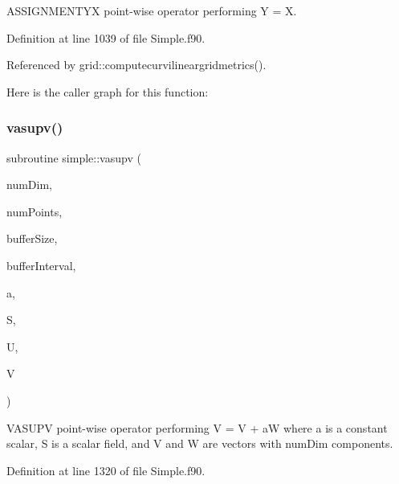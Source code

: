 A\+S\+S\+I\+G\+N\+M\+E\+N\+T\+YX point-\/wise operator performing Y = X. 



Definition at line 1039 of file Simple.\+f90.



Referenced by grid\+::computecurvilineargridmetrics().

Here is the caller graph for this function\+:
\hypertarget{namespacesimple_ac3b0bcd4d9660231edd99b833499f6c0}{}\label{namespacesimple_ac3b0bcd4d9660231edd99b833499f6c0} 
\subsubsection{\texorpdfstring{vasupv()}{vasupv()}}
{\footnotesize\ttfamily subroutine simple\+::vasupv (\begin{DoxyParamCaption}\item[{integer(kind=4), intent(in)}]{num\+Dim,  }\item[{integer(kind=8), intent(in)}]{num\+Points,  }\item[{integer(kind=8), dimension(numdim), intent(in)}]{buffer\+Size,  }\item[{integer(kind=8), dimension(2$\ast$numdim), intent(in)}]{buffer\+Interval,  }\item[{real(kind=8), intent(in)}]{a,  }\item[{real(kind=8), dimension(numpoints), intent(in)}]{S,  }\item[{real(kind=8), dimension(numdim$\ast$numpoints), intent(in)}]{U,  }\item[{real(kind=8), dimension(numdim$\ast$numpoints), intent(inout)}]{V }\end{DoxyParamCaption})}



V\+A\+S\+U\+PV point-\/wise operator performing V = V + aW where a is a constant scalar, S is a scalar field, and V and W are vectors with num\+Dim components. 



Definition at line 1320 of file Simple.\+f90.

\hypertarget{namespacesimple_ae38e091c7b77f88fbac6a96c4cd798e1}{}\label{namespacesimple_ae38e091c7b77f88fbac6a96c4cd798e1} 

